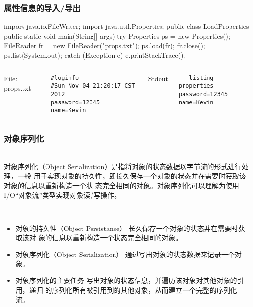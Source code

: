 \begin{frame}[fragile] %
\frametitle{属性信息的导入/导出}
\begin{javaCode}
import java.io.FileWriter;
import java.util.Properties;
public class LoadProperties {
  public static void main(String[] args) {
    try {
      Properties ps = new Properties();
      FileReader fr = new FileReader("props.txt");
      ps.load(fr);
      fr.close();
      ps.list(System.out);
    } catch (Exception e) {
      e.printStackTrace();
    }
  }
}
\end{javaCode}
\begin{columns}
File: props.txt\\
{\tiny
\begin{verbatim}
#loginfo
#Sun Nov 04 21:20:17 CST 2012
password=12345
name=Kevin
\end{verbatim}}
Stdout \\
{\tiny
\begin{verbatim}
-- listing properties --
password=12345
name=Kevin
\end{verbatim}}
\end{columns}
\end{frame}




\begin{frame}[fragile] %
\frametitle{对象序列化}

\\
\small 对象序列化（Object Serialization）是指将对象的状态数据以字节流的形式进行处理，一般
用于实现对象的持久性，即长久保存一个对象的状态并在需要时获取该对象的信息以重新构造一个状
态完全相同的对象。对象序列化可以理解为使用I/O“对象流”类型实现对象读/写操作。

\\
\begin{itemize}\kai\small
\item {\hei 对象的持久性（Object Persistance）} 长久保存一个对象的状态并在需要时获取该对
  象的信息以重新构造一个状态完全相同的对象。
\item {\hei 对象序列化（Object Serialization）} 通过写出对象的状态数据来记录一个对象。
\item {\hei 对象序列化的主要任务} 写出对象的状态信息，并遍历该对象对其他对象的引用，递归
  的序列化所有被引用到的其他对象，从而建立一个完整的序列化流。
\end{itemize}
\end{frame}


